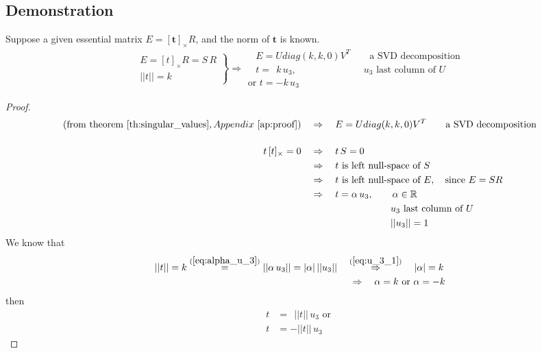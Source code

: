 \subsection{Demonstration}
\begin{theorem}
\label{th:norm}
Suppose a given essential matrix $E=[\mathbf{t}]_{\times}R$, and the norm of $\mathbf{t}$ is known.
\[ \left.
  \begin{array}{l}
  E =[t]_{\times}R = S\,R \\
  ||t||=k
  \end{array} \right\}
  \Rightarrow
  \begin{array}{l}
  ~ ~ ~ \, E = U diag(k,k,0) V^T            \quad\quad\mbox{a SVD decomposition} \\
  ~ ~ ~ \, t= ~ ~ k\,u_3,  \quad\quad\quad\quad\quad\quad\quad u_3 \mbox{~last column of~} U \\
  \mbox{or~} t=-k\,u_3
  \end{array}
\]
\end{theorem}

\begin{proof}
\begin{align}
(\mbox{from theorem~} \ref{th:singular_values}, Appendix ~\ref{ap:proof})  & \quad\Rightarrow\quad E = U diag(k,k,0) V^T            \quad\quad\mbox{a SVD decomposition} \nonumber \\[3ex]
 t\,[t]_{\times} = 0 & \quad\Rightarrow\quad  t\,S = 0 \nonumber \\
                     & \quad\Rightarrow\quad  t \mbox{~is left null-space of~} S \nonumber \\
                     & \quad\Rightarrow\quad  t \mbox{~is left null-space of~} E, \quad \mbox{since~} E=SR \nonumber \\
                     & \quad\Rightarrow\quad  t = \alpha\,u_3, \quad\quad \alpha \in \mathbb{R}  \label{eq:alpha_u_3} \\
                     & ~~~~~~~~~~~~~~~~~~~~~~ \quad\quad u_3 \mbox{~last column of~} U  \nonumber \\
                     & ~~~~~~~~~~~~~~~~~~~~~~ \quad\quad ||u_3|| = 1  \label{eq:u_3_1}
\end{align}
We know that
\begin{align*}
 ||t||=k \overset{(\ref{eq:alpha_u_3})}{=} ||\alpha\,u_3|| = |\alpha|\,||u_3|| & \quad\overset{(\ref{eq:u_3_1})}{\Rightarrow}\quad  |\alpha| = k  \\
 & ~ \quad\Rightarrow\quad \alpha = k \mbox{~or~} \alpha = -k
\end{align*}
then
\begin{align*}
 t & = ~~||t||\,u_3 \mbox{~or~} \\
 t & = - ||t||\,u_3
\end{align*}
\end{proof}


